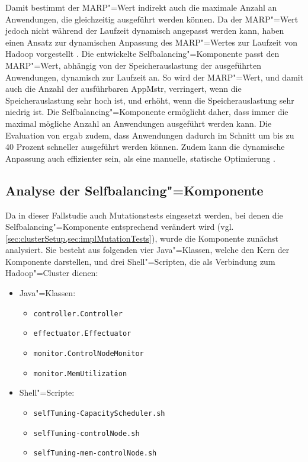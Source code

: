 Damit bestimmt der \gls{MARP}"=Wert indirekt auch die maximale Anzahl an Anwendungen, die gleichzeitig ausgeführt werden können.
Da der \gls{MARP}"=Wert jedoch nicht während der Laufzeit dynamisch angepasst werden kann, haben \citeauthor{Zhang2016} einen Ansatz zur dynamischen Anpassung des \gls{MARP}"=Wertes zur Laufzeit von Hadoop vorgestellt \cite{Zhang2016}.
Die entwickelte Selfbalancing"=Komponente passt den \gls{MARP}"=Wert, abhängig von der Speicherauslastung der ausgeführten Anwendungen, dynamisch zur Laufzeit an.
So wird der \gls{MARP}"=Wert, und damit auch die Anzahl der ausführbaren \gls{AppMstr}, verringert, wenn die Speicherauslastung sehr hoch ist, und erhöht, wenn die Speicherauslastung sehr niedrig ist.
Die Selfbalancing"=Komponente ermöglicht daher, dass immer die maximal mögliche Anzahl an Anwendungen ausgeführt werden kann.
Die Evaluation von \citeauthor{Zhang2016} ergab zudem, dass Anwendungen dadurch im Schnitt um bis zu 40 Prozent schneller ausgeführt werden können.
Zudem kann die dynamische Anpassung auch effizienter sein, als eine manuelle, statische Optimierung \cite{Zhang2016}.

\subsection{Analyse der Selfbalancing"=Komponente}
\label{subsec:selfbalancingAnalysis}

Da in dieser Fallstudie auch Mutationstests eingesetzt werden, bei denen die Selfbalancing"=Komponente entsprechend verändert wird (vgl. \cref{sec:clusterSetup,sec:implMutationTests}), wurde die Komponente zunächst analysiert.
Sie besteht aus folgenden vier Java"=Klassen, welche den Kern der Komponente darstellen, und drei Shell"=Scripten, die als Verbindung zum Hadoop"=Cluster dienen:

\begin{itemize}
    \item Java"=Klassen:
    \begin{itemize}
        \item \texttt{controller.Controller}
        \item \texttt{effectuator.Effectuator}
        \item \texttt{monitor.ControlNodeMonitor}
        \item \texttt{monitor.MemUtilization}
    \end{itemize}
    \item Shell"=Scripte:
    \begin{itemize}
        \item \texttt{selfTuning-CapacityScheduler.sh}
        \item \texttt{selfTuning-controlNode.sh}
        \item \texttt{selfTuning-mem-controlNode.sh}
    \end{itemize}
\end{itemize}

